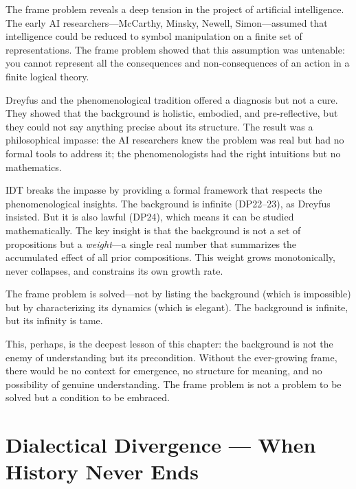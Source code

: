 The frame problem reveals a deep tension in the project of
artificial intelligence.  The early AI researchers---McCarthy, Minsky,
Newell, Simon---assumed that intelligence could be reduced to
symbol manipulation on a finite set of representations.  The frame
problem showed that this assumption was untenable: you cannot
represent all the consequences and non-consequences of an action
in a finite logical theory.

Dreyfus and the phenomenological tradition offered a diagnosis but
not a cure.  They showed that the background is holistic, embodied,
and pre-reflective, but they could not say anything precise about its
structure.  The result was a philosophical impasse: the AI researchers
knew the problem was real but had no formal tools to address it; the
phenomenologists had the right intuitions but no mathematics.

IDT breaks the impasse by providing a formal framework that
respects the phenomenological insights.  The background is infinite
(DP22--23), as Dreyfus insisted.  But it is also lawful (DP24), which
means it can be studied mathematically.  The key insight is that the
background is not a set of propositions but a \emph{weight}---a single
real number that summarizes the accumulated effect of all prior
compositions.  This weight grows monotonically, never collapses, and
constrains its own growth rate.

The frame problem is solved---not by listing the background
(which is impossible) but by characterizing its dynamics (which is
elegant).  The background is infinite, but its infinity is tame.

This, perhaps, is the deepest lesson of this chapter: the background
is not the enemy of understanding but its precondition.  Without the
ever-growing frame, there would be no context for emergence, no
structure for meaning, and no possibility of genuine understanding.
The frame problem is not a problem to be solved but a condition to
be embraced.



\chapter{Dialectical Divergence --- When History Never Ends}
\label{ch:dialectical-divergence}

